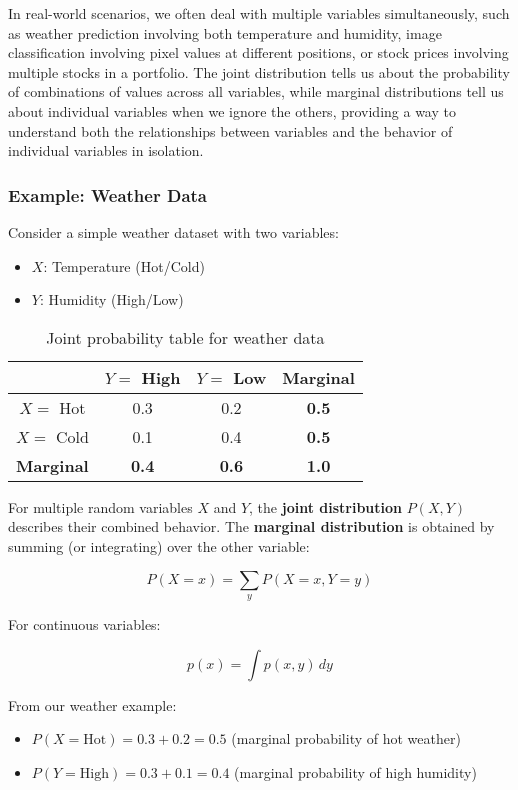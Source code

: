 In real-world scenarios, we often deal with multiple variables simultaneously, such as weather prediction involving both temperature and humidity, image classification involving pixel values at different positions, or stock prices involving multiple stocks in a portfolio. The joint distribution tells us about the probability of combinations of values across all variables, while marginal distributions tell us about individual variables when we ignore the others, providing a way to understand both the relationships between variables and the behavior of individual variables in isolation.

\subsubsection{Example: Weather Data}

Consider a simple weather dataset with two variables:
\begin{itemize}
    \item $X$: Temperature (Hot/Cold)
    \item $Y$: Humidity (High/Low)
\end{itemize}

\begin{table}[h]
\centering
\begin{tabular}{|c|c|c|c|}
\hline
 & $Y=$ High & $Y=$ Low & \textbf{Marginal} \\
\hline
$X=$ Hot & 0.3 & 0.2 & \textbf{0.5} \\
$X=$ Cold & 0.1 & 0.4 & \textbf{0.5} \\
\hline
\textbf{Marginal} & \textbf{0.4} & \textbf{0.6} & \textbf{1.0} \\
\hline
\end{tabular}
\caption{Joint probability table for weather data}
\label{tab:weather-joint}
\end{table}

For multiple random variables $X$ and $Y$, the \textbf{joint distribution} $P(X, Y)$ describes their combined behavior. The \textbf{marginal distribution} is obtained by summing (or integrating) over the other variable:

\begin{equation}
P(X=x) = \sum_{y} P(X=x, Y=y)
\end{equation}

For continuous variables:

\begin{equation}
p(x) = \int p(x, y) \, dy
\end{equation}

From our weather example:
\begin{itemize}
    \item $P(X=\text{Hot}) = 0.3 + 0.2 = 0.5$ (marginal probability of hot weather)
    \item $P(Y=\text{High}) = 0.3 + 0.1 = 0.4$ (marginal probability of high humidity)
\end{itemize}
